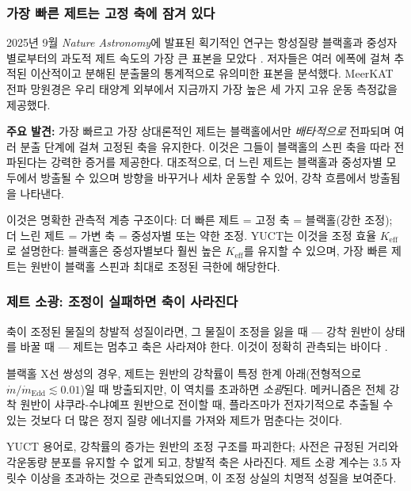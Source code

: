 \documentclass[12pt,a4paper]{article}
\begin{document}
	\subsubsection{가장 빠른 제트는 고정 축에 잠겨 있다}
	
	2025년 9월 \emph{Nature Astronomy}에 발표된 획기적인 연구는 항성질량 블랙홀과 중성자별로부터의 과도적 제트 속도의 가장 큰 표본을 모았다 \cite{NatureAstronomy2025}. 저자들은 여러 에폭에 걸쳐 추적된 이산적이고 분해된 분출물의 통계적으로 유의미한 표본을 분석했다. MeerKAT 전파 망원경은 우리 태양계 외부에서 지금까지 가장 높은 세 가지 고유 운동 측정값을 제공했다.
	
	\textbf{주요 발견:} 가장 빠르고 가장 상대론적인 제트는 블랙홀에서만 \emph{배타적으로} 전파되며 여러 분출 단계에 걸쳐 고정된 축을 유지한다. 이것은 그들이 블랙홀의 스핀 축을 따라 전파된다는 강력한 증거를 제공한다. 대조적으로, 더 느린 제트는 블랙홀과 중성자별 모두에서 방출될 수 있으며 방향을 바꾸거나 세차 운동할 수 있어, 강착 흐름에서 방출됨을 나타낸다.
	
	이것은 명확한 관측적 계층 구조이다: 더 빠른 제트 = 고정 축 = 블랙홀(강한 조정); 더 느린 제트 = 가변 축 = 중성자별 또는 약한 조정. YUCT는 이것을 조정 효율 \(K_{\mathrm{eff}}\)로 설명한다: 블랙홀은 중성자별보다 훨씬 높은 \(K_{\mathrm{eff}}\)를 유지할 수 있으며, 가장 빠른 제트는 원반이 블랙홀 스핀과 최대로 조정된 극한에 해당한다.
	
	\subsubsection{제트 소광: 조정이 실패하면 축이 사라진다}
	
	축이 조정된 물질의 창발적 성질이라면, 그 물질이 조정을 잃을 때 — 강착 원반이 상태를 바꿀 때 — 제트는 멈추고 축은 사라져야 한다. 이것이 정확히 관측되는 바이다 \cite{JetQuenching2006,JetQuenching2018}.
	
	블랙홀 X선 쌍성의 경우, 제트는 원반의 강착률이 특정 한계 아래(전형적으로 \(\dot{m}/\dot{m}_{\text{Edd}} \lesssim 0.01\))일 때 방출되지만, 이 역치를 초과하면 \emph{소광}된다. 메커니즘은 전체 강착 원반이 샤쿠라-수냐예프 원반으로 전이할 때, 플라즈마가 전자기적으로 추출될 수 있는 것보다 더 많은 정지 질량 에너지를 가져와 제트가 멈춘다는 것이다.
	
	YUCT 용어로, 강착률의 증가는 원반의 조정 구조를 파괴한다; 사전은 규정된 거리와 각운동량 분포를 유지할 수 없게 되고, 창발적 축은 사라진다. 제트 소광 계수는 3.5 자릿수 이상을 초과하는 것으로 관측되었으며, 이 조정 상실의 치명적 성질을 보여준다.
	
\end{document}
